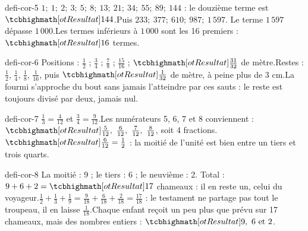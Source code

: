 \begin{blocEdition}{defi-cor-5}
$1 ;\ 1 ;\ 2 ;\ 3 ;\ 5 ;\ 8 ;\ 13 ;\ 21 ;\ 34 ;\ 55 ;\ 89 ;\ 144$ : le douzième terme est $\res{144}$.Puis $233 ;\ 377 ;\ 610 ;\ 987 ;\ 1\,597$. Le terme $1\,597$ dépasse $1\,000$.Les termes inférieurs à $1\,000$ sont les 16 premiers : $\res{16}$ termes.
\end{blocEdition}
\begin{blocEdition}{defi-cor-6}
Positions : $\frac12$ ; $\frac34$ ; $\frac78$ ; $\frac{15}{16}$ ; $\res{\frac{31}{32}}$ de mètre.Restes : $\frac12$, $\frac14$, $\frac18$, $\frac1{16}$, puis $\res{\frac1{32}}$ de mètre, à peine plus de 3 cm.La fourmi s’approche du bout sans jamais l’atteindre par ces sauts : le reste est toujours divisé par deux, jamais nul.
\end{blocEdition}
\begin{blocEdition}{defi-cor-7}
$\frac13=\frac4{12}$ et $\frac34=\frac9{12}$.Les numérateurs 5, 6, 7 et 8 conviennent : $\res{\frac5{12},\ \frac6{12},\ \frac7{12},\ \frac8{12}}$, soit 4 fractions.$\res{\frac6{12}=\frac12}$ : la moitié de l’unité est bien entre un tiers et trois quarts.
\end{blocEdition}
\begin{blocEdition}{defi-cor-8}
La moitié : 9 ; le tiers : 6 ; le neuvième : 2. Total : $9+6+2=\res{17}$ chameaux : il en reste un, celui du voyageur.$\frac12+\frac13+\frac19=\frac9{18}+\frac6{18}+\frac2{18}=\frac{17}{18}$ : le testament ne partage pas tout le troupeau, il en laisse $\frac1{18}$.Chaque enfant reçoit un peu plus que prévu sur 17 chameaux, mais des nombres entiers : $\res{9,\ 6\text{ et }2}$.
\end{blocEdition}

